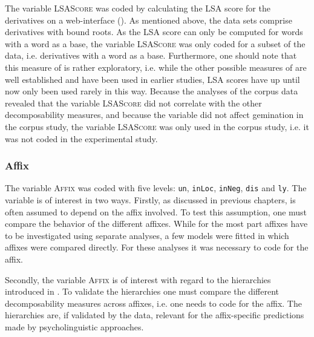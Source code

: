 The variable \textsc{LSAScore} was coded by calculating the LSA score for the derivatives on a web-interface (\citealt{UniversityofColoradoBoulder.25.06.2015}). %
As mentioned above, the data sets comprise derivatives with bound roots. As the LSA score can only be computed for words with a word as a base, the variable \textsc{LSAScore} was only coded for a subset of the data, i.e. derivatives with a word as a base. Furthermore, one should note that this measure of  is rather exploratory, i.e. while the other possible measures of  are well established and have been used in earlier studies, LSA scores have up until now only been used rarely in this way. Because the  analyses of the corpus data revealed that the variable \textsc{LSAScore} did not correlate with the other decomposability measures, and because the variable did not affect {gemination} in the corpus study, the variable \textsc{LSAScore} was only used in the corpus study, i.e. it was not coded in the experimental study.

\subsubsection{Affix} 
The variable \textsc{Affix} was coded with five levels: \texttt{un}, \texttt{inLoc}, \texttt{inNeg}, \texttt{dis} and \texttt{ly}. The variable is of interest in two ways. 
Firstly, as discussed in previous chapters,  is often assumed to depend on the affix involved. To test this assumption, one must compare the  behavior of the different affixes. While for the most part affixes have to be investigated using separate analyses, a few models were fitted in which affixes were compared directly. For these analyses it was necessary to code for the affix.


Secondly, the variable \textsc{Affix} is of interest with regard to the  hierarchies introduced in . To validate the hierarchies one must compare the different decomposability measures across affixes, i.e. one needs to code for the affix. The  hierarchies are, if validated by the data, relevant for the affix-specific predictions made by psycholinguistic approaches. 


